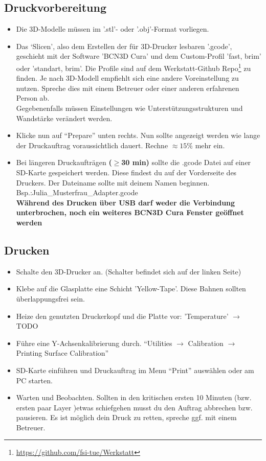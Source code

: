 \documentclass[a4paper]{article}
\begin{document}
\subsection{Druckvorbereitung}
\begin{itemize}
	\item Die 3D-Modelle müssen im '.stl'- oder '.obj'-Format vorliegen.
	\item Das ‘Slicen’, also dem Erstellen der für 3D-Drucker lesbaren '.gcode',  geschieht mit der Software 'BCN3D Cura' und dem Custom-Profil 'fast, brim' oder 'standart, brim'. Die Profile sind auf dem Werkstatt-Github Repo\footnote{\url{https://github.com/fsi-tue/Werkstatt}} zu finden.
	Je nach 3D-Modell empfiehlt sich eine andere Voreinstellung zu nutzen. Spreche dies mit einem Betreuer oder einer anderen erfahrenen Person ab.\\
	Gegebenenfalls müssen Einstellungen wie Unterstützungsstrukturen und Wandstärke verändert werden.
	\item Klicke nun auf "`Prepare"' unten rechts. Nun sollte angezeigt werden wie lange der Druckauftrag voraussichtlich dauert. Rechne $\approx 15\%$ mehr ein.
	\item Bei längeren Druckaufträgen \textbf{($\geq$30 min)} sollte die .gcode Datei auf einer SD-Karte gespeichert werden. Diese findest du auf der Vorderseite des Druckers. Der Dateiname sollte mit deinem Namen beginnen. Bsp.:Julia\_Musterfrau\_Adapter.gcode\\
	\textbf{Während des Drucken über USB darf weder die Verbindung unterbrochen, noch ein weiteres BCN3D Cura Fenster geöffnet werden}
\end{itemize}
\subsection{Drucken}
\begin{itemize}
	\item Schalte den 3D-Drucker an. (Schalter befindet sich auf der linken Seite)
	\item Klebe auf die Glasplatte eine Schicht 'Yellow-Tape'. Diese Bahnen sollten überlappungsfrei sein.
	\item Heize den genutzten Druckerkopf und die Platte vor: 'Temperature' $\rightarrow$ TODO
	\item Führe eine Y-Achsenkalibrierung durch. "`Utilities  $\rightarrow$ Calibration $\rightarrow $Printing Surface Calibration"'
	\item SD-Karte einführen und Druckauftrag im Menu "`Print"' auswählen oder am PC starten.
	\item Warten und Beobachten. Sollten in den kritischen ersten 10 Minuten (bzw. ersten paar Layer )etwas schiefgehen musst du den Auftrag abbrechen bzw. pausieren. Es ist möglich dein Druck zu retten, spreche ggf. mit einem Betreuer.
\end{itemize}
\end{document}
